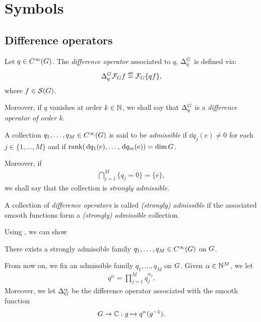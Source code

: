 \chapter{Symbols}

\section{Difference operators}

\begin{definition}
\label{definition:difference_operators}
    Let $q \in {C^\infty(G)}$.
    The \emph{difference operator} associated to $q$, ${\Delta^{G}_{q}}$ is defined via:
    \begin{align*}
        \DifferenceOperator{q} \Fourier f \defeq \Fourier\{q f\},
    \end{align*}
    where $f \in {\mathcal{S} (G)}$.

    Moreover, if $q$ vanishes at order $k \in \mathbb{N}$,
    we shall say that ${\Delta^{G}_{q}}$ is a \emph{difference operator of order $k$}.
\end{definition}

\begin{definition}
\label{definition:admissibility_of_difference_operators}
    A collection $q_1, \dots, q_M \in {C^\infty(G)}$ is said to be \emph{admissible}
    if $\dd q_j(e) \neq 0$ for each $j \in \{1, \dots, M\}$
    and if $\operatorname{rank}(\,\mathrm{d} q_1(e), \dots, \,\mathrm{d} q_m(e)) = \dim G$.

    Moreover, if
    \begin{align*}
        \bigcap_{j = 1}^M \{ q_j = 0 \} = \{e\},
    \end{align*}
    we shall say that the collection is \emph{strongly admissible}.

    A collection of \emph{difference operators} is called \emph{(strongly) admissible}
    if the associated smooth functions form a \emph{(strongly) admissible} collection.
\end{definition}

Using \cite[Lemma 4.4]{RuzhanskyTurunenWirth10}, we can show

\begin{lemma}
    There exists a strongly admissible family $q_1, \dots, q_M \in {C^\infty(G)}$ on $G$.
\end{lemma}

\begin{remark}
    From now on, we fix an admissible family $q_1, \dots, q_M$ on $G$.
    Given $\alpha \in \mathbb{N}^M$, we let
    \begin{align*}
        q^\alpha = \prod_{j = 1}^M q_j^{\alpha_j}.
    \end{align*}
    Moreover, we let ${\Delta_{G}^{\alpha}}$ be the difference operator associated with the smooth function
    \begin{align*}
        G \to \mathbb{C} : g \mapsto q^\alpha(g^{-1}).
    \end{align*}
\end{remark}

